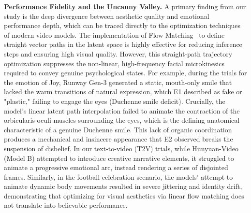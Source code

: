 \documentclass[pdflatex,sn-mathphys-num]{sn-jnl}
\newcommand{\emJoy}{Joy\xspace}
\newcommand{\Eone}{\colorbox{gray!15}{E1}\xspace}
\newcommand{\Etwo}{\colorbox{gray!30}{E2}\xspace}
\theoremstyle{thmstyleone}
\theoremstyle{thmstyletwo}
\theoremstyle{thmstylethree}
\begin{document}
\textbf{Performance Fidelity and the Uncanny Valley.} A primary finding from our study is the deep divergence between aesthetic quality and emotional performance depth, which can be traced directly to the optimization techniques of modern video models. The implementation of Flow Matching~\cite{lipman2022flow} to define straight vector paths in the latent space is highly effective for reducing inference steps and ensuring high visual quality. However, this straight-path trajectory optimization suppresses the non-linear, high-frequency facial microkinesics required to convey genuine psychological states. For example, during the trials for the emotion of \emJoy, Runway Gen-3 generated a static, mouth-only smile that lacked the warm transitions of natural expression, which \Eone described as fake or "plastic," failing to engage the eyes (Duchenne smile deficit). Crucially, the model's linear latent path interpolation failed to animate the contraction of the orbicularis oculi muscles surrounding the eyes, which is the defining anatomical characteristic of a genuine Duchenne smile. This lack of organic coordination produces a mechanical and insincere appearance that \Etwo observed breaks the suspension of disbelief. In our text-to-video (T2V) trials, while Hunyuan-Video (Model B) attempted to introduce creative narrative elements, it struggled to animate a progressive emotional arc, instead rendering a series of disjointed frames. Similarly, in the football celebration scenario, the models' attempt to animate dynamic body movements resulted in severe jittering and identity drift, demonstrating that optimizing for visual aesthetics via linear flow matching does not translate into believable performance.
\end{document}
